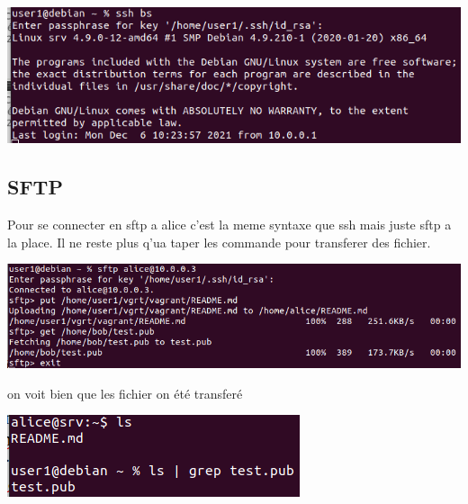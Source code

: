 \documentclass{article}
\begin{document}
 \begin{center}
        \includegraphics[scale=0.47]{Images/bsresult.png}
 \end{center}
 
 
 
 \subsection{\large{SFTP}}
 Pour se connecter en sftp a alice c'est la meme syntaxe que ssh mais juste sftp a la place. Il ne reste plus q'ua taper les commande pour transferer des fichier.
 
 \begin{center}
        \includegraphics[scale=0.47]{Images/sftp.png}
 \end{center}
 
 on voit bien que les fichier on été transferé
 
  \begin{center}
        \includegraphics[scale=0.47]{Images/sftpresult.png}
 \end{center}
 
 
  \newpage
 
 
\end{document}
